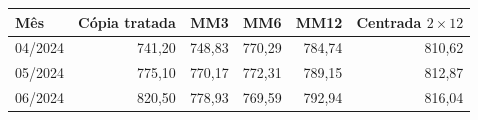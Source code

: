 \begin{tabular}{lrrrrr}
\toprule
Mês & Cópia tratada & MM3 & MM6 & MM12 & Centrada $2\times12$ \\
\midrule
04/2024 & 741,20 & 748,83 & 770,29 & 784,74 & 810,62 \\
05/2024 & 775,10 & 770,17 & 772,31 & 789,15 & 812,87 \\
06/2024 & 820,50 & 778,93 & 769,59 & 792,94 & 816,04 \\
\bottomrule
\end{tabular}
